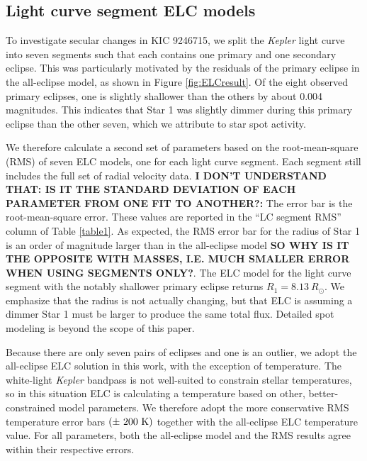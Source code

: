 \subsection{Light curve segment ELC models}\label{segment}
To investigate secular changes in KIC 9246715, we split the \emph{Kepler} light curve into seven segments such that each contains one primary and one secondary eclipse. This was particularly motivated by the residuals of the primary eclipse in the all-eclipse model, as shown in Figure \ref{fig:ELCresult}. Of the eight observed primary eclipses, one is slightly shallower than the others by about 0.004 magnitudes. This indicates that Star 1 was slightly dimmer during this primary eclipse than the other seven, which we attribute to star spot activity.

We therefore calculate a second set of parameters based on the root-mean-square (RMS) of seven ELC models, one for each light curve segment. Each segment still includes the full set of radial velocity data. {\bf{I DON'T UNDERSTAND THAT: IS IT THE STANDARD DEVIATION OF EACH PARAMETER FROM ONE FIT TO ANOTHER?:}} The error bar is the root-mean-square error. These values are reported in the ``LC segment RMS'' column of Table \ref{table1}. As expected, the RMS error bar for the radius of Star 1 is an order of magnitude larger than in the all-eclipse model {\bf{SO WHY IS IT THE OPPOSITE WITH MASSES, I.E. MUCH SMALLER ERROR WHEN USING SEGMENTS ONLY?}}. The ELC model for the light curve segment with the notably shallower primary eclipse returns $R_1 = 8.13 \ R_{\odot}$. We emphasize that the radius is not actually changing, but that ELC is assuming a dimmer Star 1 must be larger to produce the same total flux. Detailed spot modeling is beyond the scope of this paper.

Because there are only seven pairs of eclipses and one is an outlier, we adopt the all-eclipse ELC solution in this work, with the exception of temperature. The white-light \emph{Kepler} bandpass is not well-suited to constrain stellar temperatures, so in this situation ELC is calculating a temperature based on other, better-constrained model parameters. We therefore adopt the more conservative RMS temperature error bars $(\pm ~200 \ \rm{K})$ together with the all-eclipse ELC temperature value. For all parameters, both the all-eclipse model and the RMS results agree within their respective errors.
    
    
  
  
  
  
  
  
  
  